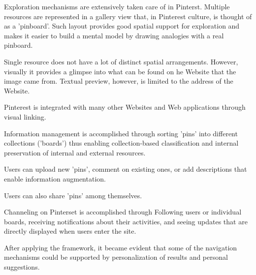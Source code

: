 {Exploration mechanisms are extensively taken care of in Pinterst. Multiple resources are represented in a gallery view that, in Pinterest culture, is thought of as a 'pinboard'. Such layout provides good spatial support for exploration and makes it easier to build a mental model by drawing analogies with a real pinboard. 

Single resource does not have a lot of distinct spatial arrangements. However, visually it provides a glimpse into what can be found on he Website that the image came from. Textual preview, however, is limited to the address of the Website.

Pinterest is integrated with many other Websites and Web applications through visual linking.

Information management is accomplished through sorting 'pins' into different collections ('boards') thus enabling collection-based classification and internal preservation of internal and external resources. 

Users can upload new 'pins', comment on existing ones, or add descriptions that enable information augmentation. 

Users can also share 'pins' among themselves. 

Channeling on Pinterset is accomplished through Following users or individual boards, receiving notifications about their activities, and seeing updates that are directly displayed when users enter the site. 

After applying the framework, it became evident that some of the navigation mechanisms could be supported by personalization of results and personal suggestions.

} %


